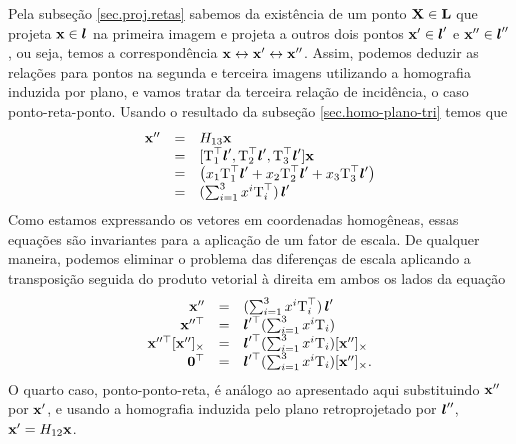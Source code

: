 Pela subseção \ref{sec.proj.retas} sabemos da existência de um ponto $\mathbf{X}\in{\bf L}$ que projeta $\mathbf{x}\in\boldsymbol{l}$ na primeira imagem e projeta a outros dois pontos $\mathbf{x}'\in\boldsymbol{l}'$ e $\mathbf{x}''\in\boldsymbol{l}''$, ou seja, temos a correspondência $\mathbf{x}\leftrightarrow\mathbf{x}'\leftrightarrow\mathbf{x}''$. Assim, podemos deduzir as relações para 
pontos na segunda e terceira imagens utilizando a homografia induzida por plano, e vamos tratar da terceira relação de incidência, o caso ponto-reta-ponto. Usando o resultado da subseção \ref{sec.homo-plano-tri} temos que 
\begin{equation*}
\begin{array}{rcl}
\mathbf{x}''&=&H_{13}\mathbf{x}\\
&=&[\mbox{T}_1^\top\boldsymbol{l}',\mbox{T}_2^\top\boldsymbol{l}',\mbox{T}_3^\top\boldsymbol{l}']\mathbf{x}\\
&=&
\begin{pmatrix}
x_1\mbox{T}_1^\top\boldsymbol{l}'+x_2\mbox{T}_2^\top\boldsymbol{l}'+x_3\mbox{T}_3^\top\boldsymbol{l}'
\end{pmatrix}\\
&=&(\sum_{i=1}^3 x^i\mbox{T}_i^\top)\,\boldsymbol{l}'
\end{array}
\end{equation*}
Como estamos expressando os vetores em coordenadas homogêneas, essas equações são invariantes para a aplicação de um fator de escala. De qualquer maneira, podemos eliminar o problema das diferenças de escala aplicando a transposição seguida do produto vetorial à direita em ambos os lados da equação
\begin{equation}\label{eq.ponto-reta-ponto}
\begin{array}{rcl}
\mathbf{x}''&=&(\sum_{i=1}^3 x^i\mbox{T}_i^\top)\,\boldsymbol{l}'\\
\mathbf{x}''^\top&=&\boldsymbol{l}'^\top(\sum_{i=1}^3 x^i\mbox{T}_i)\\
\mathbf{x}''^\top[\mathbf{x}'']_\times&=&\boldsymbol{l}'^\top(\sum_{i=1}^3 x^i\mbox{T}_i)[\mathbf{x}'']_\times\\
{\bf 0}^\top&=&\boldsymbol{l}'^\top(\sum_{i=1}^3 x^i\mbox{T}_i)[\mathbf{x}'']_\times.
\end{array}
\end{equation}
O quarto caso, ponto-ponto-reta, é análogo ao apresentado aqui substituindo $\mathbf{x}''$ por $\mathbf{x}'$, e usando a homografia induzida pelo plano retroprojetado por $\boldsymbol{l}''$, $\mathbf{x}'=H_{12}\mathbf{x}$.

